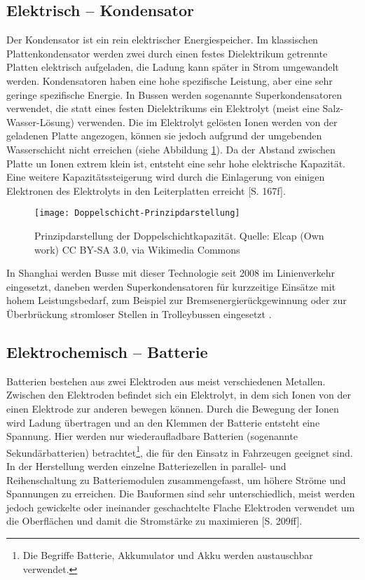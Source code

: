 \subsection{Elektrisch – Kondensator} %
Der Kondensator ist ein rein elektrischer Energiespeicher. Im klassischen Plattenkondensator werden zwei durch einen festes Dielektrikum getrennte Platten elektrisch aufgeladen, die Ladung kann später in Strom umgewandelt werden. Kondensatoren haben eine hohe spezifische Leistung, aber eine sehr geringe spezifische Energie. In Bussen werden sogenannte Superkondensatoren verwendet, die statt eines festen Dielektrikums ein Elektrolyt (meist eine Salz-Wasser-Lösung) verwenden. Die im Elektrolyt gelösten Ionen werden von der geladenen Platte angezogen, können sie jedoch aufgrund der umgebenden Wasserschicht nicht erreichen (siehe Abbildung \ref{abb_doppelschicht}). Da der Abstand zwischen Platte un Ionen extrem klein ist, entsteht eine sehr hohe elektrische Kapazität. Eine weitere Kapazitätssteigerung wird durch die Einlagerung von einigen Elektronen des Elektrolyts in den Leiterplatten erreicht \cite{Sterner:2014}[S. 167f].

\begin{figure}\centering
	 \texttt{[image: Doppelschicht-Prinzipdarstellung]}
	 \caption{Prinzipdarstellung der Doppelschichtkapazität. Quelle: Elcap (Own work) CC BY-SA 3.0, via Wikimedia Commons}
	 \label{abb_doppelschicht}
\end{figure}

In Shanghai werden Busse mit dieser Technologie seit 2008 im Linienverkehr eingesetzt, daneben werden Superkondensatoren für kurzzeitige Einsätze mit hohem Leistungsbedarf, zum Beispiel zur Bremsenergierückgewinnung oder zur Überbrückung stromloser Stellen in Trolleybussen eingesetzt \cite{Barminer-Busgesellschaft:2012}.

\subsection{Elektrochemisch – Batterie} %
Batterien bestehen aus zwei Elektroden aus meist verschiedenen Metallen. Zwischen den Elektroden befindet sich ein Elektrolyt, in dem sich Ionen von der einen Elektrode zur anderen bewegen können. Durch die Bewegung der Ionen wird Ladung übertragen und an den Klemmen der Batterie entsteht eine Spannung. Hier werden nur wiederaufladbare Batterien (sogenannte Sekundärbatterien) betrachtet\footnote{Die Begriffe Batterie, Akkumulator und Akku werden austauschbar verwendet.}, die für den Einsatz in Fahrzeugen geeignet sind. In der Herstellung werden einzelne Batteriezellen in parallel- und Reihenschaltung zu Batteriemodulen zusammengefasst, um höhere Ströme und Spannungen zu erreichen. Die Bauformen sind sehr unterschiedlich, meist werden jedoch gewickelte oder ineinander geschachtelte Flache Elektroden verwendet um die Oberflächen und damit die Stromstärke zu maximieren \cite{Sterner:2014}[S. 209ff].

